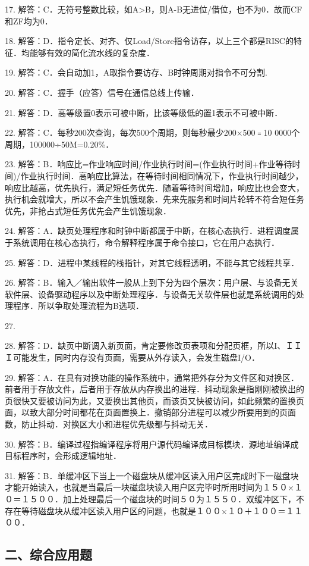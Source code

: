 17. 解答：C．无符号整数比较，如A>B，则A-B无进位/借位，也不为0．故而CF和ZF均为0．

18. 解答：D．指令定长、对齐、仅Load/Store指令访存，以上三个都是RISC的特征．均能够有效的简化流水线的复杂度．

19. 解答：C．会自动加1，A取指令要访存、B时钟周期对指令不可分割.

20. 解答：C．握手（应答）信号在通信总线上传输．

21. 解答：D．高等级置0表示可被中断，比该等级低的置1表示不可被中断．

22. 解答：C．每秒200次查询，每次500个周期，则每秒最少200×500﹦10 0000个周期，100000÷50M=0.20\%．

23. 解答：B．响应比=作业响应时间/作业执行时间=(作业执行时间+作业等待时间)/作业执行时间．高响应比算法，在等待时间相同情况下，作业执行时间越少，响应比越高，优先执行，满足短任务优先．随着等待时间增加，响应比也会变大，执行机会就增大，所以不会产生饥饿现象．先来先服务和时间片轮转不符合短任务优先，非抢占式短任务优先会产生饥饿现象．

24. 解答：A．缺页处理程序和时钟中断都属于中断，在核心态执行．进程调度属于系统调用在核心态执行，命令解释程序属于命令接口，它在用户态执行．

25. 解答：D．进程中某线程的栈指针，对其它线程透明，不能与其它线程共享．

26. 解答：B．输入／输出软件一般从上到下分为四个层次：用户层、与设备无关软件层、设备驱动程序以及中断处理程序．与设备无关软件层也就是系统调用的处理程序．所以争取处理流程为B选项．

27. 

28. 解答：D．缺页中断调入新页面，肯定要修改页表项和分配页框，所以I、ＩＩＩ可能发生，同时内存没有页面，需要从外存读入，会发生磁盘I/O．

29. 解答：A．在具有对换功能的操作系统中，通常把外存分为文件区和对换区．前者用于存放文件，后者用于存放从内存换出的进程．抖动现象是指刚刚被换出的页很快又要被访问为此，又要换出其他页，而该页又快被访问，如此频繁的置换页面，以致大部分时间都花在页面置换上．撤销部分进程可以减少所要用到的页面数，防止抖动．对换区大小和进程优先级都与抖动无关．

30. 解答：B．编译过程指编译程序将用户源代码编译成目标模块．源地址编译成目标程序时，会形成逻辑地址．

31. 解答：B．单缓冲区下当上一个磁盘块从缓冲区读入用户区完成时下一磁盘块才能开始读入，也就是当最后一块磁盘块读入用户区完毕时所用时间为１５０×１０＝１５００．加上处理最后一个磁盘块的时间５０为１５５０．双缓冲区下，不存在等待磁盘块从缓冲区读入用户区的问题，也就是１００×１０＋１００＝１１００．


\subsection{二、综合应用题}